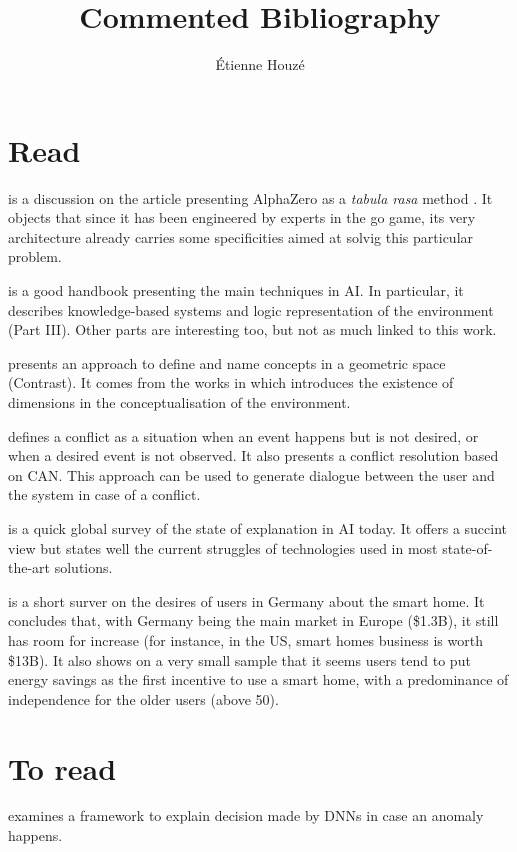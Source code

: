 \documentclass{article}
\title{Commented Bibliography}
\author{\'Etienne Houzé}
\date{}
\begin{document}
\maketitle
    \section{Read}

    \cite{marcus2018innateness} is a discussion on the article presenting AlphaZero as a \emph{tabula rasa} method \cite{silver2017mastering}. It objects that since it has been engineered by experts in the go game, its very architecture already carries some specificities aimed at solvig this particular problem.

    \cite{russell2016artificial} is a good handbook presenting the main techniques in AI. In particular, it describes knowledge-based systems and logic representation of the environment (Part III). Other parts are interesting too, but not as much linked to this work.

    \cite{dessalles2015conceptual}  presents an approach to define and name concepts in a geometric space (Contrast). It comes from the works in \cite{gardenfors2004conceptual} which introduces the existence of dimensions in the conceptualisation of the environment.

    \cite{dessalles2008computational} defines a conflict as a situation when an event happens but is not desired, or when a desired event is not observed. It also presents a conflict resolution based on CAN. This approach can be used to generate dialogue between the user and the system in case of a conflict.

    \cite{dovsilovic2018explainable} is a quick global survey of the state of explanation in AI today. It offers a succint view but states well the current struggles of technologies used in most state-of-the-art solutions.

    \cite{zimmermann2017user} is a short surver on the desires of users in Germany about the smart home. It concludes that, with Germany being the main market in Europe (\$1.3B), it still has room for increase (for instance, in the US, smart homes business is worth \$13B). It also shows on a very small sample that it seems users tend to put energy savings as the first incentive to use a smart home, with a predominance of independence for the older users (above 50).

    \section{To read}

    \cite{amarasinghe2018toward} examines a framework to explain decision made by DNNs in case an anomaly happens.
\newpage


\end{document}

